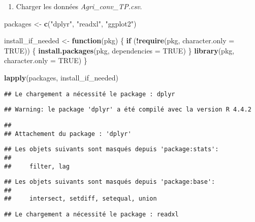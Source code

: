 \documentclass[
]{article}
\newenvironment{Shaded}{\begin{snugshade}}{\end{snugshade}}
\newcommand{\AttributeTok}[1]{\textcolor[rgb]{0.13,0.29,0.53}{#1}}
\newcommand{\ConstantTok}[1]{\textcolor[rgb]{0.56,0.35,0.01}{#1}}
\newcommand{\ControlFlowTok}[1]{\textcolor[rgb]{0.13,0.29,0.53}{\textbf{#1}}}
\newcommand{\FunctionTok}[1]{\textcolor[rgb]{0.13,0.29,0.53}{\textbf{#1}}}
\newcommand{\NormalTok}[1]{#1}
\newcommand{\OtherTok}[1]{\textcolor[rgb]{0.56,0.35,0.01}{#1}}
\newcommand{\SpecialCharTok}[1]{\textcolor[rgb]{0.81,0.36,0.00}{\textbf{#1}}}
\newcommand{\StringTok}[1]{\textcolor[rgb]{0.31,0.60,0.02}{#1}}
\providecommand{\tightlist}{%
  \setlength{\itemsep}{0pt}\setlength{\parskip}{0pt}}
\begin{document}
\begin{enumerate}
\def\labelenumi{\arabic{enumi}.}
\setcounter{enumi}{-1}
\tightlist
\item
  Charger les données \emph{Agri\_conv\_TP.csv}.
\end{enumerate}

\begin{Shaded}
\begin{Highlighting}[]
\NormalTok{packages }\OtherTok{\textless{}{-}} \FunctionTok{c}\NormalTok{(}\StringTok{"dplyr"}\NormalTok{, }\StringTok{"readxl"}\NormalTok{, }\StringTok{"ggplot2"}\NormalTok{)}
                
\NormalTok{install\_if\_needed }\OtherTok{\textless{}{-}} \ControlFlowTok{function}\NormalTok{(pkg) \{                }
  \ControlFlowTok{if}\NormalTok{ (}\SpecialCharTok{!}\FunctionTok{require}\NormalTok{(pkg, }\AttributeTok{character.only =} \ConstantTok{TRUE}\NormalTok{)) \{}
    \FunctionTok{install.packages}\NormalTok{(pkg, }\AttributeTok{dependencies =} \ConstantTok{TRUE}\NormalTok{)}
\NormalTok{  \}}
  \FunctionTok{library}\NormalTok{(pkg, }\AttributeTok{character.only =} \ConstantTok{TRUE}\NormalTok{)}
\NormalTok{\}}

\FunctionTok{lapply}\NormalTok{(packages, install\_if\_needed)}
\end{Highlighting}
\end{Shaded}

\begin{verbatim}
## Le chargement a nécessité le package : dplyr
\end{verbatim}

\begin{verbatim}
## Warning: le package 'dplyr' a été compilé avec la version R 4.4.2
\end{verbatim}

\begin{verbatim}
## 
## Attachement du package : 'dplyr'
\end{verbatim}

\begin{verbatim}
## Les objets suivants sont masqués depuis 'package:stats':
## 
##     filter, lag
\end{verbatim}

\begin{verbatim}
## Les objets suivants sont masqués depuis 'package:base':
## 
##     intersect, setdiff, setequal, union
\end{verbatim}

\begin{verbatim}
## Le chargement a nécessité le package : readxl
\end{verbatim}
\end{document}
